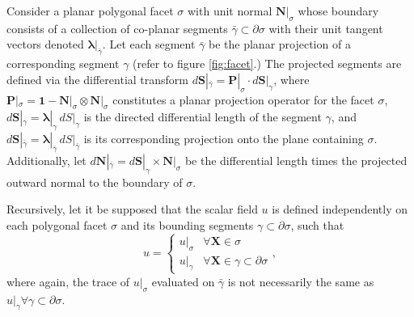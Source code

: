 \documentclass[10pt,a4paper]{article}
\begin{document}
Consider a planar polygonal facet $\sigma$ with unit normal $\mathbf{N} |_{\sigma}$ whose boundary consists of a collection of co-planar segments $\bar{\gamma} \subset \partial \sigma$ with their unit tangent vectors denoted $\boldsymbol{\lambda} |_{\bar{\gamma}}$. Let each segment $\bar{\gamma}$ be the planar projection of a corresponding segment $\gamma$ (refer to figure \ref{fig:facet}.) The projected segments are defined via the differential transform $d \mathbf{S} |_{\bar{\gamma}} = \mathbf{P} |_{\sigma} \cdot d \mathbf{S} |_{\gamma}$, where $\mathbf{P} |_{\sigma} = \mathbf{1} - \mathbf{N} |_{\sigma} \otimes \mathbf{N} |_{\sigma}$ constitutes a planar projection operator for the facet $\sigma$, $d \mathbf{S} |_{\gamma} = \boldsymbol{\lambda} |_{\gamma} \, dS |_{\gamma}$ is the directed differential length of the segment $\gamma$, and $d \mathbf{S} |_{\bar{\gamma}} = \boldsymbol{\lambda} |_{\bar{\gamma}} \, dS |_{\bar{\gamma}}$ is its corresponding projection onto the plane containing $\sigma$.
Additionally, let $d \mathbf{N} |_{\bar{\gamma}} = d \mathbf{S} |_{\gamma} \times \mathbf{N} |_{\sigma}$ be the differential length times the projected outward normal to the boundary of $\sigma$.

Recursively, let it be supposed that the scalar field $u$ is defined independently on each polygonal facet $\sigma$ and its bounding segments $\gamma \subset \partial \sigma$, such that
\begin{equation}
  u = \left\{ \begin{array}{cc} u |_{\sigma} & \forall \mathbf{X} \in \sigma \\ u |_{\gamma} & \forall \mathbf{X} \in \gamma \subset \partial \sigma \end{array} \right. ,
\end{equation}
where again, the trace of $u |_{\sigma}$ evaluated on $\bar{\gamma}$ is not necessarily the same as $u |_{\gamma} \forall \gamma \subset \partial \sigma$.
\end{document}
